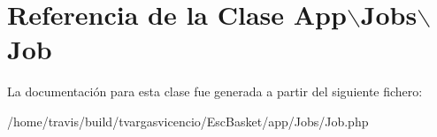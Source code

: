 \hypertarget{class_app_1_1_jobs_1_1_job}{\section{\-Referencia de la \-Clase \-App$\backslash$\-Jobs$\backslash$\-Job}
\label{class_app_1_1_jobs_1_1_job}
}


\-La documentación para esta clase fue generada a partir del siguiente fichero\-:\begin{DoxyCompactItemize}
\item 
/home/travis/build/tvargasvicencio/\-Esc\-Basket/app/\-Jobs/\-Job.\-php\end{DoxyCompactItemize}
